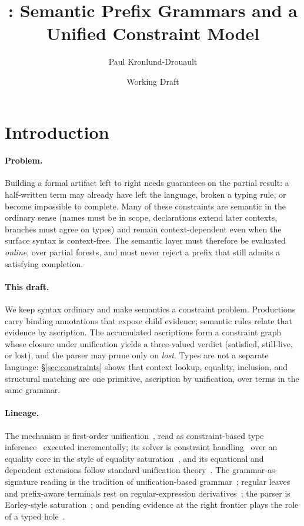 \documentclass[11pt]{article}
\title{\aufbau: Semantic Prefix Grammars and a Unified Constraint Model}
\author{Paul Kronlund-Drouault}
\date{Working Draft}
\begin{document}
\maketitle

\section{Introduction}
\label{sec:introduction}

\paragraph{Problem.}
Building a formal artifact left to right needs guarantees on the partial result:
a half-written term may already have left the language, broken a typing rule, or
become impossible to complete. Many of these constraints are semantic in the
ordinary sense (names must be in scope, declarations extend later contexts,
branches must agree on types) and remain context-dependent even when the
surface syntax is context-free. The semantic layer must therefore be evaluated
\emph{online}, over partial forests, and must never reject a prefix that still
admits a satisfying completion.

\paragraph{This draft.}
We keep syntax ordinary and make semantics a constraint problem. Productions
carry binding annotations that expose child evidence; semantic rules relate that
evidence by ascription. The accumulated ascriptions form a constraint graph
whose closure under unification yields a three-valued verdict (satisfied,
still-live, or lost), and the parser may prune only on \emph{lost}. Types are
not a separate language: \S\ref{sec:constraints} shows that context lookup,
equality, inclusion, and structural matching are one primitive, ascription by
unification, over terms in the same grammar.

\paragraph{Lineage.}
The mechanism is first-order unification~\cite{robinson1965,martelli1982}, read
as constraint-based type inference~\cite{PottierRemy2005} executed incrementally;
its solver is constraint handling~\cite{Sneyers2009} over an equality core in the
style of equality saturation~\cite{Willsey2021,Tiurin2024}, and its equational and
dependent extensions follow standard unification
theory~\cite{baader2001unification,miller1991}. The grammar-as-signature reading
is the tradition of unification-based grammar~\cite{shieber1986unification};
regular leaves and prefix-aware terminals rest on regular-expression
derivatives~\cite{brzozowski1964derivatives,owens2009regex}; the parser is
Earley-style saturation~\cite{earley1970efficient}; and pending evidence at the
right frontier plays the role of a typed hole~\cite{omar2017hazelnut,zhao2024marking}.
\end{document}
